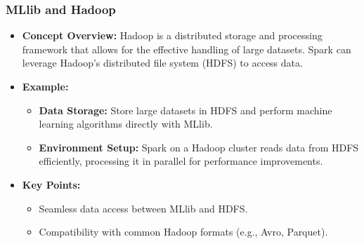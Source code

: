 \documentclass[aspectratio=169]{beamer}
\begin{document}
\begin{frame}[fragile]
    \frametitle{MLlib and Hadoop}
    \begin{itemize}
        \item \textbf{Concept Overview:} 
        Hadoop is a distributed storage and processing framework that allows for the effective handling of large datasets. Spark can leverage Hadoop's distributed file system (HDFS) to access data.
        
        \item \textbf{Example:}
        \begin{itemize}
            \item \textbf{Data Storage:} Store large datasets in HDFS and perform machine learning algorithms directly with MLlib.
            \item \textbf{Environment Setup:} Spark on a Hadoop cluster reads data from HDFS efficiently, processing it in parallel for performance improvements.
        \end{itemize}
        
        \item \textbf{Key Points:}
        \begin{itemize}
            \item Seamless data access between MLlib and HDFS.
            \item Compatibility with common Hadoop formats (e.g., Avro, Parquet).
        \end{itemize}
    \end{itemize}
\end{frame}
\end{document}
